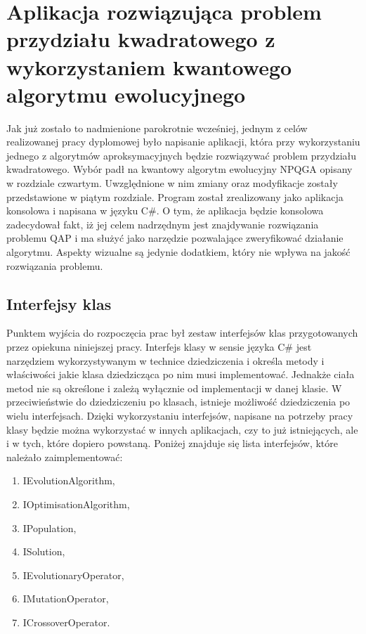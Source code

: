 \chapter{Aplikacja rozwiązująca problem przydziału kwadratowego z wykorzystaniem kwantowego algorytmu ewolucyjnego}
\label{cha:aplikacja}
Jak już zostało to nadmienione parokrotnie wcześniej, jednym z celów realizowanej pracy dyplomowej było napisanie aplikacji, która przy wykorzystaniu jednego z algorytmów aproksymacyjnych będzie rozwiązywać problem przydziału kwadratowego. Wybór padł na kwantowy algorytm ewolucyjny NPQGA opisany w rozdziale czwartym. Uwzględnione w nim zmiany oraz modyfikacje zostały przedstawione w piątym rozdziale. Program został zrealizowany jako aplikacja konsolowa i napisana w języku C\#. O tym, że aplikacja będzie konsolowa zadecydował fakt, iż jej celem nadrzędnym jest znajdywanie rozwiązania problemu QAP i ma służyć jako narzędzie pozwalające zweryfikować działanie algorytmu. Aspekty wizualne są jedynie dodatkiem, który nie wpływa na jakość rozwiązania problemu.

\section{Interfejsy klas}
Punktem wyjścia do rozpoczęcia prac był zestaw interfejsów klas przygotowanych przez opiekuna niniejszej pracy. Interfejs klasy w sensie języka C\# jest narzędziem wykorzystywanym w technice dziedziczenia i określa metody i właściwości jakie klasa dziedzicząca po nim musi implementować. Jednakże ciała metod nie są określone i zależą wyłącznie od implementacji w danej klasie. W przeciwieństwie do dziedziczeniu po klasach, istnieje możliwość dziedziczenia po wielu interfejsach. Dzięki wykorzystaniu interfejsów, napisane na potrzeby pracy klasy będzie można wykorzystać w innych aplikacjach, czy to już istniejących, ale i w tych, które dopiero powstaną. Poniżej znajduje się lista interfejsów, które należało zaimplementować:
\begin{enumerate}
\item IEvolutionAlgorithm,
\item IOptimisationAlgorithm,
\item IPopulation,
\item ISolution,
\item IEvolutionaryOperator,
\item IMutationOperator,
\item ICrossoverOperator.
\end{enumerate}

